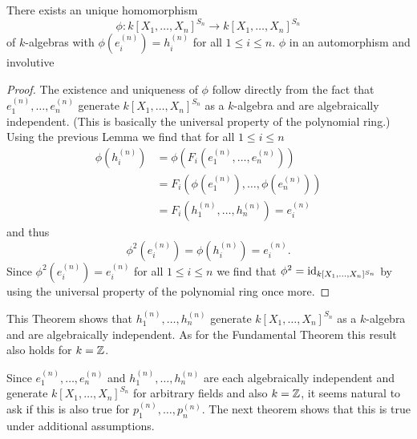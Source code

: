 \begin{thrm}
There exists an unique homomorphism
\[
          \phi
  \colon  k[X_1, \dotsc, X_n]^{S_n}
  \to     k[X_1, \dotsc, X_n]^{S_n}
\]
of $k$-algebras with $\phi\left(e^{(n)}_i\right) = h^{(n)}_i$ for all $1 \leq i \leq n$.
$\phi$ in an automorphism and involutive
\end{thrm}
\begin{proof}
  The existence and uniqueness of $\phi$ follow directly from the fact that $e^{(n)}_1, \dotsc, e^{(n)}_n$ generate $k[X_1, \dotsc, X_n]^{S_n}$ as a $k$-algebra and are algebraically independent.
  (This is basically the universal property of the polynomial ring.)
  Using the previous Lemma we find that for all $1 \leq i \leq n$
  \begin{align*}
        \phi\left(h^{(n)}_i\right)
    &=  \phi\left(F_i\left(e^{(n)}_1, \dotsc, e^{(n)}_n\right)\right) \\
    &=  F_i\left(\phi\left(e^{(n)}_1\right), \dotsc, \phi\left(e^{(n)}_n\right)\right) \\
    &=  F_i\left(h^{(n)}_1, \dotsc, h^{(n)}_n\right)
    =   e^{(n)}_i
  \end{align*}
  and thus
  \[
      \phi^2\left(e^{(n)}_i\right)
    = \phi\left(h^{(n)}_i\right) = e^{(n)}_i.
  \]
  Since $\phi^2\left(e^{(n)}_i\right) = e^{(n)}_i$ for all $1 \leq i \leq n$ we find that $\phi^2 = \operatorname{id}_{k[X_1, \dotsc, X_n]^{S_n}}$ by using the universal property of the polynomial ring once more.
\end{proof}


This Theorem shows that $h^{(n)}_1, \dotsc, h^{(n)}_n$ generate $k[X_1, \dotsc, X_n]^{S_n}$ as a $k$-algebra and are algebraically independent.
As for the Fundamental Theorem this result also holds for $k = \mathbb{Z}$.


Since $e^{(n)}_1, \dotsc, e^{(n)}_n$ and $h^{(n)}_1, \dotsc, h^{(n)}_n$ are each algebraically independent and generate $k[X_1, \dotsc, X_n]^{S_n}$ for arbitrary fields and also $k = \mathbb{Z}$, it seems natural to ask if this is also true for $p^{(n)}_1, \dotsc, p^{(n)}_n$.
The next theorem shows that this is true under additional assumptions.


